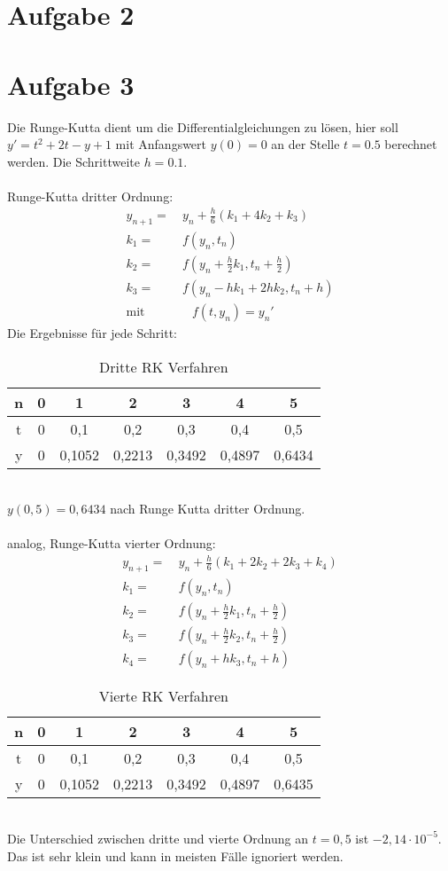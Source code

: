 \section{Aufgabe 2}
\section{Aufgabe 3}
Die Runge-Kutta dient um die Differentialgleichungen zu lösen, hier soll $y' = t^2 + 2t - y + 1$ mit Anfangswert $y(0) = 0$ an der Stelle $t=0.5$ berechnet werden. Die Schrittweite $h = 0.1$.\\\\
Runge-Kutta dritter Ordnung:
\begin{align}
	y_{n+1} = & \  y_n + \frac{h}{6} (k_1 + 4k_2 + k_3) \\
	k_1 = & \  f(y_n,t_n) \\
	k_2 = & \  f(y_n + \frac{h}{2}k_1, t_n + \frac{h}{2}) \\
	k_3 = & \  f(y_n - hk_1 + 2hk_2, t_n + h) \\
	\text{mit} & \quad  f(t,y_n) = y_n'
\end{align}
Die Ergebnisse für jede Schritt:
\begin{table}[htpb]\centering
	\begin{tabular}{|c|c|c|c|c|c|c|}
		\hline
		n & 0 & 1  & 2  & 3  & 4  & 5  \\ \hline
		t &0     & 0,1    & 0,2    & 0,3    & 0,4    & 0,5    \\ \hline
		y & 0     & 0,1052 & 0,2213 & 0,3492 & 0,4897 & 0,6434 \\ \hline
	\end{tabular}
	\caption{Dritte RK Verfahren}
\end{table}\\
$y(0,5) = 0,6434$ nach Runge Kutta dritter Ordnung. \\\\
analog, Runge-Kutta vierter Ordnung: 
\begin{align} \label{2}
	y_{n+1} = & \  y_n + \frac{h}{6} (k_1 + 2k_2 +2 k_3 + k_4) \\
	k_1 = & \  f(y_n,t_n) \\
	k_2 = & \  f(y_n + \frac{h}{2}k_1, t_n + \frac{h}{2}) \\
	k_3 = & \  f(y_n + \frac{h}{2}k_2, t_n + \frac{h}{2}) \\
	k_4 = & \  f(y_n + hk_3,t_n + h) \label{3}
\end{align}
\begin{table}[htpb]\centering
	\begin{tabular}{|c|c|c|c|c|c|c|}
		\hline
		n & 0 & 1  & 2  & 3  & 4  & 5  \\ \hline
		t &0     & 0,1    & 0,2    & 0,3    & 0,4    & 0,5    \\ \hline
		y & 0     & 0,1052 & 0,2213 & 0,3492 & 0,4897 & 0,6435 \\ \hline
	\end{tabular}
	\caption{Vierte RK Verfahren}
\end{table}\\
Die Unterschied zwischen dritte und vierte Ordnung an $t = 0,5$ ist $-2,14 \cdot 10^{-5}$. Das ist sehr klein und kann in meisten Fälle ignoriert werden.  \clearpage
